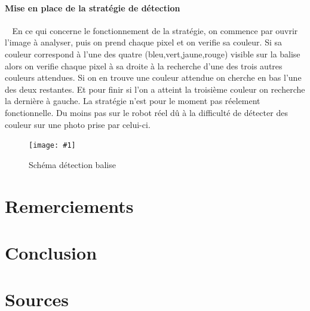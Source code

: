 \documentclass[12pt]{article}
\def\tab{$\>\>\>\>$}
\newcommand\img[2]{
\begin{figure}[!h]
  \centering
    \texttt{[image: \#1]}
  \caption{#2}
  \label{img:#1}
\end{figure}
}
\begin{document}
\paragraph{Mise en place de la stratégie de détection\\}
\tab En ce qui concerne le fonctionnement de la stratégie, on commence par ouvrir l'image à analyser, puis on prend chaque pixel et on verifie sa couleur. Si sa couleur correspond à l'une des quatre (bleu,vert,jaune,rouge) visible sur la balise alors on verifie chaque pixel à sa droite à la recherche d'une des trois autres couleurs attendues. Si on en trouve une couleur attendue on cherche en bas l'une des deux restantes. Et pour finir si l'on a atteint la troisième couleur on recherche la dernière à gauche. La stratégie n'est pour le moment pas réelement fonctionnelle. Du moins pas sur le robot réel dû à la difficulté de détecter des couleur sur une photo prise par celui-ci.

\img{Images/baliseschema.png}{Schéma détection balise}

\newpage

\section{Remerciements}

\newpage

\section{Conclusion}

\newpage

\section{Sources}
\end{document}
